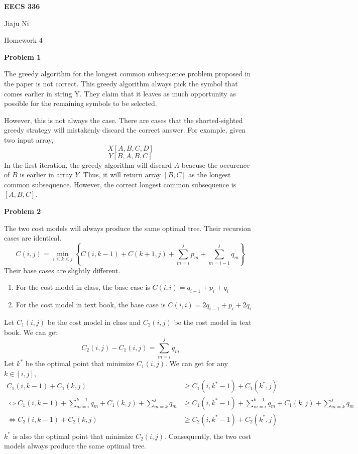 \documentclass[12pt,letterpaper]{article}
\def\pp{\par\noindent}
\newcommand{\problem}[1]{ \bigskip \pp \textbf{Problem #1}\par}
\begin{document}
\centerline{\bf EECS 336}

\medskip
\centerline{Jiaju Ni}
\centerline{Homework 4}
\bigskip


\problem{1}
The greedy algorithm for the longest common subsequence problem proposed in the paper is not correct. This greedy algorithm always pick the symbol that comes earlier in string Y. They claim that it leaves as much opportunity as possible for the remaining symbols to be selected.\par
However, this is not always the case. There are cases that the shorted-sighted greedy strategy will mistakenly discard the correct answer. For example, given two input array,
\[X[A, B, C, D]\]
\[Y[B, A, B, C]\]
In the first iteration, the greedy algorithm will discard $A$ beacuse the occurence of $B$ is earlier in array $Y$. Thus, it will return array $[B, C]$ as the longest common subsequence. However, the correct longest common subsequence is $[A, B, C]$.

\problem{2}
The two cost models will always produce the same optimal tree. Their recursion cases are identical.
\[
	C(i,j)=\underset{i\leq k\leq j}{\min}\left\{C(i,k-1)+C(k+1,j)+\sum_{m=i}^jp_m+\sum_{m=i-1}^jq_m\right\}
\]
Their base cases are slightly different.
\begin{enumerate}
	\item For the cost model in class, the base case is $C(i,i)=q_{i-1}+p_i+q_i$
	\item For the cost model in text book, the base case is $C(i,i)=2q_{i-1}+p_i+2q_i$
\end{enumerate}
Let $C_1(i,j)$ be the cost model in class and $C_2(i,j)$ be the cost model in text book. We can get
\[
	C_2(i,j)-C_1(i,j)=\sum_{m=i}^jq_m
\]
Let $k^*$ be the optimal point that minimize $C_1(i,j)$. We can get for any $k\in[i,j]$,
\begin{align*}
	C_1(i,k-1)+C_1(k,j)&\geq C_1(i,k^*-1)+C_1(k^*,j)\\
	\Leftrightarrow C_1(i,k-1)+\sum_{m=i}^{k-1}q_m+C_1(k,j)+\sum_{m=k}^jq_m&\geq C_1(i,k^*-1)+\sum_{m=i}^{k-1}q_m+C_1(k,j)+\sum_{m=k}^jq_m\\
	\Leftrightarrow C_2(i,k-1)+C_2(k,j)&\geq C_2(i,k^*-1)+C_2(k^*,j)\\
\end{align*}
$k^*$ is also the optimal point that minimize $C_2(i,j)$. Consequently, the two cost models always produce the same optimal tree.	
\end{document}
